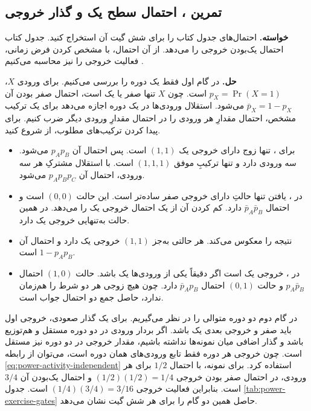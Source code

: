 \subsection{تمرین ، احتمال سطح یک و گذار خروجی}
\label{sec:power-exercise-gates}

\textbf{خواسته.}
احتمال‌های جدول  کتاب را برای شش گیت آن استخراج
کنید. جدول کتاب احتمال یک‌بودن خروجی را می‌دهد. از آن احتمال،
با مشخص کردن فرض زمانی، فعالیت خروجی را نیز محاسبه می‌کنیم
\cite[جدول  و تمرین ، صفحات ۱۸۷ و ۲۰۹]{weste}.

\textbf{حل.}
در گام اول فقط یک دوره را بررسی می‌کنیم. برای ورودی \(X\)،
\(p_X=\Pr(X=1)\) است. چون \(X\) تنها صفر یا یک است، احتمال
صفر بودن آن \(\bar p_X=1-p_X\) می‌شود. استقلال ورودی‌ها در یک
دوره اجازه می‌دهد برای یک ترکیب مشخص، احتمال مقدارِ هر ورودی را
در احتمال مقدارِ ورودی دیگر ضرب کنیم. برای پیدا کردن ترکیب‌های
مطلوب، از 
شروع کنید.

\begin{itemize}
  \item برای ، تنها زوج دارای خروجی یک \((1,1)\) است.
    پس احتمال آن \(p_Ap_B\) می‌شود.  سه ورودی دارد
    و تنها ترکیبِ موفق \((1,1,1)\) است. با استقلال مشترکِ هر سه
    ورودی، احتمال آن \(p_Ap_Bp_C\) می‌شود.
  \item در ، یافتن تنها حالتِ دارای خروجی صفر ساده‌تر
    است. این حالت \((0,0)\) است و احتمال \(\bar p_A\bar p_B\)
    دارد. کم کردن آن از یک احتمال خروجی یک را می‌دهد. در
     همین حالت به‌تنهایی خروجی یک دارد.
  \item {} نتیجه  را معکوس می‌کند. هر حالتی
    به‌جز \((1,1)\) خروجی یک دارد و احتمال آن \(1-p_Ap_B\) است.
  \item در ، خروجی یک است اگر دقیقاً یکی از ورودی‌ها
    یک باشد. حالت \((1,0)\) احتمال \(p_A\bar p_B\) و حالت
    \((0,1)\) احتمال \(\bar p_Ap_B\) دارد. چون هیچ زوجی هر دو
    شرط را هم‌زمان ندارد، حاصل جمع دو احتمال جواب است.
\end{itemize}

در گام دوم دو دوره متوالی را در نظر می‌گیریم. برای یک گذار صعودی،
خروجی اول باید صفر و خروجی بعدی یک باشد. اگر بردار ورودی در دو
دوره مستقل و هم‌توزیع باشد و گذار اضافی میان نمونه‌ها نداشته باشیم،
مقدار خروجی در دو دوره نیز مستقل است. چون خروجی هر دوره فقط تابع
ورودی‌های همان دوره است، می‌توان از رابطه
\eqref{eq:power-activity-independent} استفاده کرد.
برای نمونه، با احتمال \(1/2\) برای هر ورودی، در 
احتمال صفر بودن خروجی \((1/2)(1/2)=1/4\) و احتمال یک‌بودن آن
\(3/4\) است. بنابراین فعالیت خروجی \((1/4)(3/4)=3/16\) است.
جدول \ref{tab:power-exercise-gates} حاصل همین دو گام را برای هر
شش گیت نشان می‌دهد.

